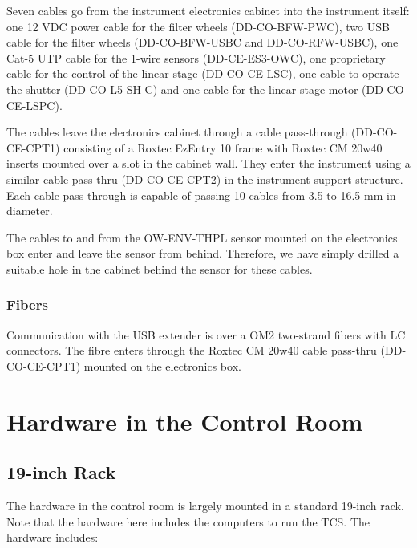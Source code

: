 \documentclass{article}
\begin{document}
Seven cables go from the instrument electronics cabinet into the instrument itself: one 12 VDC power cable for the filter wheels (DD-CO-BFW-PWC), two USB cable for the filter wheels (DD-CO-BFW-USBC and DD-CO-RFW-USBC), one Cat-5 UTP cable for the 1-wire sensors (DD-CE-ES3-OWC), one proprietary cable for the control of the linear stage (DD-CO-CE-LSC), one cable to operate the shutter (DD-CO-L5-SH-C) and one cable for the linear stage motor (DD-CO-CE-LSPC).

The cables leave the electronics cabinet through a cable pass-through (DD-CO-CE-CPT1) consisting of a Roxtec EzEntry 10 frame with Roxtec CM 20w40 inserts mounted over a slot in the cabinet wall. They enter the instrument using a similar cable pass-thru (DD-CO-CE-CPT2) in the instrument support structure. Each cable pass-through is capable of passing 10 cables from 3.5 to 16.5 mm in diameter. 

The cables to and from the OW-ENV-THPL sensor mounted on the electronics box enter and leave the sensor from behind. Therefore, we have simply drilled a suitable hole in the cabinet behind the sensor for these cables.

\subsubsection{Fibers}

Communication with the USB extender is over a OM2 two-strand fibers with LC connectors. The fibre enters through the Roxtec CM 20w40 cable pass-thru (DD-CO-CE-CPT1)  mounted on the electronics box.

\clearpage
\section{Hardware in the Control Room}

\subsection{19-inch Rack}

The hardware in the control room is largely mounted in a standard 19-inch rack. Note that the hardware here includes the computers to run the TCS. The hardware includes:
\end{document}
